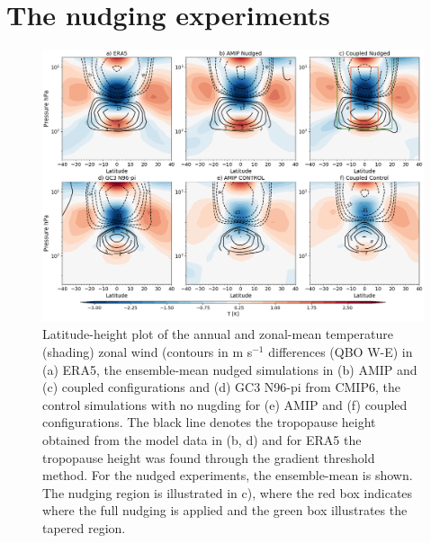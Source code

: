 \section{The nudging experiments}\label{sq:nudging}

\begin{figure}[t!]
\centering
 \includegraphics[width=\linewidth]{figures/zonal_thesis.png}
\caption[Zonal-mean zonal wind QBO difference]{Latitude-height plot of the annual and zonal-mean temperature (shading) zonal wind (contours in m s$^{-1}$ differences (QBO W-E) in (a) ERA5, the ensemble-mean nudged simulations in (b) AMIP and (c) coupled configurations and (d) GC3 N96-pi from CMIP6, the control simulations with no nugding for (e) AMIP and (f) coupled configurations. The black line denotes the tropopause height obtained from the model data in (b, d) and for ERA5 the tropopause height was found through the gradient threshold method. For the nudged experiments, the ensemble-mean is shown. The nudging region is illustrated in c), where the red box indicates where the full nudging is applied and the green box illustrates the tapered region. }
\label{fig:zonal_u}
\end{figure}


